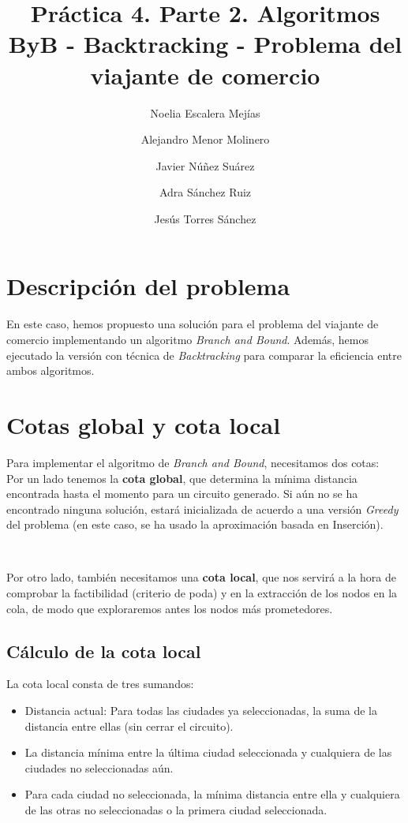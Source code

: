 \documentclass{article}
\title{Práctica 4. Parte 2. Algoritmos ByB - Backtracking - Problema del viajante de comercio}
\author{Noelia Escalera Mejías \\
	\and Alejandro Menor Molinero \\
	\and Javier Núñez Suárez \\
	\and Adra Sánchez Ruiz \\
	\and Jesús Torres Sánchez}
\begin{document}
	\maketitle
	\section{Descripción del problema}
	En este caso, hemos propuesto una solución para el problema del viajante de comercio implementando un algoritmo \textit{Branch and Bound}. Además, hemos ejecutado la versión con técnica de \textit{Backtracking} para comparar la eficiencia entre ambos algoritmos.
	
	\section{Cotas global y cota local}
	Para implementar el algoritmo de \textit{Branch and Bound}, necesitamos dos cotas: 
	\\
	
	Por un lado tenemos la \textbf{cota global}, que determina la mínima distancia encontrada hasta el momento para un circuito generado. Si aún no se ha encontrado ninguna solución, estará inicializada de acuerdo a una versión \textit{Greedy} del problema (en este caso, se ha usado la aproximación basada en Inserción).
	
	\
	
	Por otro lado, también necesitamos una \textbf{cota local}, que nos servirá a la hora de comprobar la factibilidad (criterio de poda) y en la extracción de los nodos en la cola, de modo que exploraremos antes los nodos más prometedores.
	\subsection{Cálculo de la cota local}
	La cota local consta de tres sumandos:
	\begin{itemize}
		\item Distancia actual: Para todas las ciudades ya seleccionadas, la suma de la distancia entre ellas (sin cerrar el circuito).
		\item La distancia mínima entre la última ciudad seleccionada y cualquiera de las ciudades no seleccionadas aún.
		\item Para cada ciudad no seleccionada, la mínima distancia entre ella y cualquiera de las otras no seleccionadas o la primera ciudad seleccionada.
	\end{itemize}
	
\end{document}
